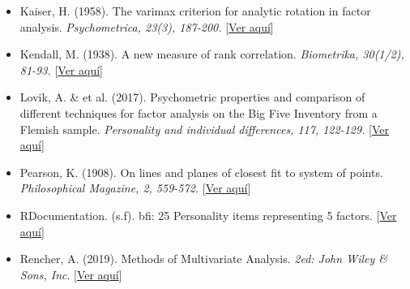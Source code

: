 \documentclass{report}
\begin{document}
\begin{itemize}
\item Kaiser, H. (1958). The varimax criterion for analytic rotation in factor analysis.\textit{ Psychometrica, 23(3), 187-200.}
[\textcolor{blue}{\href{http://cda.psych.uiuc.edu/psychometrika_highly_cited_articles/kaiser_1958.pdf}{Ver aquí}}]
\vspace{0.4cm}

\item Kendall, M. (1938). A new measure of rank correlation.\textit{ Biometrika, 30(1/2), 81-93.}
[\textcolor{blue}{\href{https://www.jstor.org/stable/2332226}{Ver aquí}}]
\vspace{0.4cm}

\item Lovik, A. \& et al. (2017). Psychometric properties and comparison of different techniques for factor analysis on the Big Five Inventory from a Flemish sample.\textit{ Personality and individual differences, 117, 122-129.}
[\textcolor{blue}{\href{https://www.sciencedirect.com/science/article/pii/S0191886917303859?casa_token=jpPBkAY19IkAAAAA:EkHHUJNNToWVoowAb6CLg3MJ43kfrIPFMX4pGF5hUAoi4LEmTk-7d9gWNYizA4G2FQHJ4_rbfHE}{Ver aquí}}]
\vspace{0.4cm}
 
\item Pearson, K. (1908). On lines and planes of closest fit to system of points.\textit{ Philosophical Magazine, 2, 559-572.}
[\textcolor{blue}{\href{http://pca.narod.ru/pearson1901.pdf}{Ver aquí}}]
\vspace{0.4cm}

\item RDocumentation. (s.f). bfi: 25 Personality items representing 5 factors.
[\textcolor{blue}{\href{https://www.rdocumentation.org/packages/psych/versions/2.2.5/topics/bfi}{Ver aquí}}]
\vspace{0.4cm}

\item Rencher, A. (2019). Methods of Multivariate Analysis. \textit{ 2ed: John Wiley & Sons, Inc}. [\textcolor{blue}{\href{https://www.ipen.br/biblioteca/slr/cel/0241}{Ver aquí}}]
\vspace{0.4cm}

\end{itemize}
\end{document}
